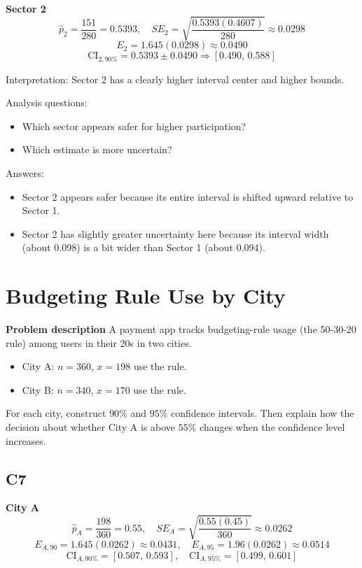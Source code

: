 	\textbf{Sector 2}
	\[
	\hat p_2=\frac{151}{280}=0.5393,
	\quad SE_2=\sqrt{\frac{0.5393(0.4607)}{280}}\approx 0.0298
	\]
	\[
	E_2=1.645(0.0298)\approx 0.0490
	\]
	\[
	\text{CI}_{2,90\%}=0.5393\pm 0.0490\Rightarrow [0.490,\,0.588]
	\]
	
	Interpretation: Sector 2 has a clearly higher interval center and higher bounds.
	
	Analysis questions:
	\begin{itemize}
		\item Which sector appears safer for higher participation?
		\item Which estimate is more uncertain?
	\end{itemize}
	
	Answers:
	\begin{itemize}
		\item Sector 2 appears safer because its entire interval is shifted upward relative to Sector 1.
		\item Sector 2 has slightly greater uncertainty here because its interval width (about 0.098) is a bit wider than Sector 1 (about 0.094).
	\end{itemize}
	
	\section{Budgeting Rule Use by City}
	\textbf{Problem description}
	A payment app tracks budgeting-rule usage (the 50-30-20 rule) among users in their 20s in two cities.
	\begin{itemize}
		\item City A: \(n=360\), \(x=198\) use the rule.
		\item City B: \(n=340\), \(x=170\) use the rule.
	\end{itemize}
	For each city, construct \(90\%\) and \(95\%\) confidence intervals. Then explain how the decision about whether City A is above \(55\%\) changes when the confidence level increases.
	
	\subsection*{C7}
	\textbf{City A}
	\[
	\hat p_A=\frac{198}{360}=0.55,
	\quad SE_A=\sqrt{\frac{0.55(0.45)}{360}}\approx 0.0262
	\]
	\[
	E_{A,90}=1.645(0.0262)\approx 0.0431,
	\quad E_{A,95}=1.96(0.0262)\approx 0.0514
	\]
	\[
	\text{CI}_{A,90\%}=[0.507,\,0.593],
	\quad \text{CI}_{A,95\%}=[0.499,\,0.601]
	\]
	
